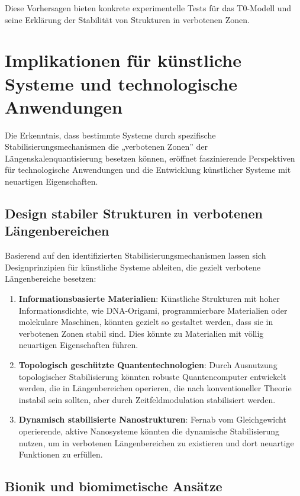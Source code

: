\documentclass[12pt,a4paper]{article}
\begin{document}
	Diese Vorhersagen bieten konkrete experimentelle Tests für das T0-Modell und seine Erklärung der Stabilität von Strukturen in verbotenen Zonen.
	
	\section{Implikationen für künstliche Systeme und technologische Anwendungen}
	
	Die Erkenntnis, dass bestimmte Systeme durch spezifische Stabilisierungsmechanismen die „verbotenen Zonen'' der Längenskalenquantisierung besetzen können, eröffnet faszinierende Perspektiven für technologische Anwendungen und die Entwicklung künstlicher Systeme mit neuartigen Eigenschaften.
	
	\subsection{Design stabiler Strukturen in verbotenen Längenbereichen}
	
	Basierend auf den identifizierten Stabilisierungsmechanismen lassen sich Designprinzipien für künstliche Systeme ableiten, die gezielt verbotene Längenbereiche besetzen:
	
	\begin{enumerate}
		\item \textbf{Informationsbasierte Materialien}: Künstliche Strukturen mit hoher Informationsdichte, wie DNA-Origami, programmierbare Materialien oder molekulare Maschinen, könnten gezielt so gestaltet werden, dass sie in verbotenen Zonen stabil sind. Dies könnte zu Materialien mit völlig neuartigen Eigenschaften führen.
		
		\item \textbf{Topologisch geschützte Quantentechnologien}: Durch Ausnutzung topologischer Stabilisierung könnten robuste Quantencomputer entwickelt werden, die in Längenbereichen operieren, die nach konventioneller Theorie instabil sein sollten, aber durch Zeitfeldmodulation stabilisiert werden.
		
		\item \textbf{Dynamisch stabilisierte Nanostrukturen}: Fernab vom Gleichgewicht operierende, aktive Nanosysteme könnten die dynamische Stabilisierung nutzen, um in verbotenen Längenbereichen zu existieren und dort neuartige Funktionen zu erfüllen.
	\end{enumerate}
	
	\subsection{Bionik und biomimetische Ansätze}
	
\end{document}
